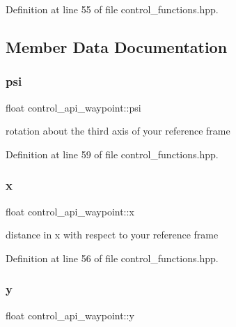 Definition at line 55 of file control\+\_\+functions.\+hpp.



\subsection{Member Data Documentation}
\mbox{\label{structcontrol__api__waypoint_a053fed6c42cdeda2029d2db548f357b4}} 
\subsubsection{\texorpdfstring{psi}{psi}}
{\footnotesize\ttfamily float control\+\_\+api\+\_\+waypoint\+::psi}



rotation about the third axis of your reference frame 



Definition at line 59 of file control\+\_\+functions.\+hpp.

\mbox{\label{structcontrol__api__waypoint_a381813ee0649f54116dec8d8ed78b26e}} 
\subsubsection{\texorpdfstring{x}{x}}
{\footnotesize\ttfamily float control\+\_\+api\+\_\+waypoint\+::x}



distance in x with respect to your reference frame 



Definition at line 56 of file control\+\_\+functions.\+hpp.

\mbox{\label{structcontrol__api__waypoint_ac92d8860930259ccb19aa91072d94546}} 
\subsubsection{\texorpdfstring{y}{y}}
{\footnotesize\ttfamily float control\+\_\+api\+\_\+waypoint\+::y}



